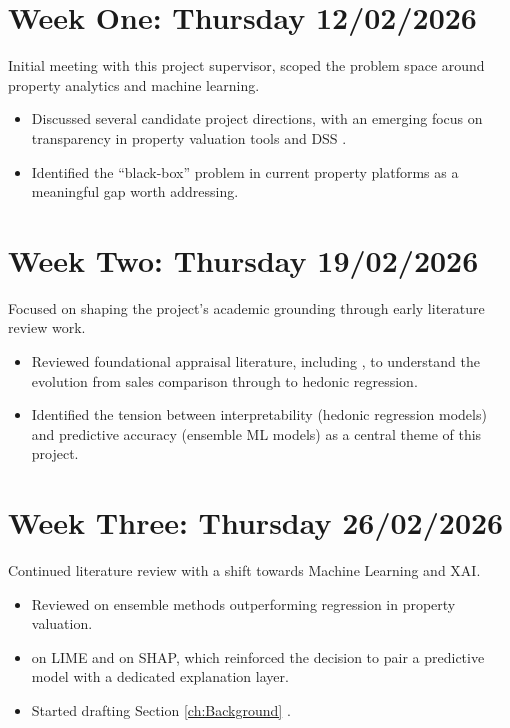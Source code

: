 \section*{Week One: Thursday 12/02/2026}
Initial meeting with this project supervisor, scoped the problem space around property analytics and machine learning. 
\begin{itemize}
  \item Discussed several candidate project directions, with an emerging focus on transparency in property valuation tools and DSS \parencite{Giudice2019}.
  \item Identified the ``black-box'' problem in current property platforms as a meaningful gap worth addressing.
\end{itemize}

\section*{Week Two: Thursday 19/02/2026}
Focused on shaping the project's academic grounding through early literature review work.
\begin{itemize}
    \item Reviewed foundational appraisal literature, including \textcite{Rosen1974} \textcite{Pagourtzi2003}, to understand the evolution from sales comparison through to hedonic regression.
    \item Identified the tension between interpretability (hedonic regression models) and predictive accuracy (ensemble ML models) as a central theme of this project.
\end{itemize}

\section*{Week Three: Thursday 26/02/2026}
Continued literature review with a shift towards Machine Learning and XAI.
\begin{itemize}
    \item Reviewed \textcite{Ho2020} \textcite{Rico-Juan2021} \textcite{Kim2025} on ensemble methods outperforming regression in property valuation.
    \item \textcite{Ribeiro2016} on LIME and \textcite{Lundberg2017} on SHAP, which reinforced the decision to pair a predictive model with a dedicated explanation layer.
    \item Started drafting Section \ref{ch:Background} .
\end{itemize}

